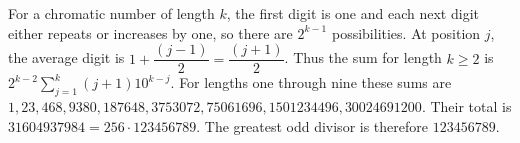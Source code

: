 For a chromatic number of length $k$, the first digit is one and each next digit either repeats or increases by one, so there are $2^{k-1}$ possibilities. At position $j$, the average digit is $1+\dfrac{(j-1)}{2}=\dfrac{(j+1)}{2}$. Thus the sum for length $k\ge2$ is $2^{k-2}\sum_{j=1}^k(j+1)10^{k-j}$. For lengths one through nine these sums are $1,23,468,9380,187648,3753072,75061696,1501234496,30024691200$. Their total is $31604937984=256\cdot123456789$. The greatest odd divisor is therefore $\boxed{123456789}$.
